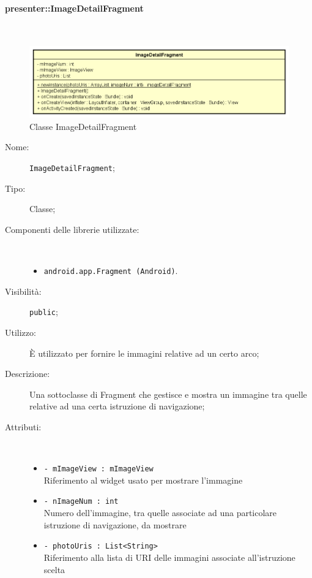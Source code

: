 \documentclass[../DefinizioneDiProdotto.tex]{subfiles}
\begin{document}
\paragraph{presenter::ImageDetailFragment}
\
\begin{figure}[H]
	\centering
	\includegraphics[width=\maxwidth]{img/ImageDetailFragment.png}
	\caption{Classe ImageDetailFragment}\label{fig:presenter::ImageDetailFragment} 
\end{figure}
\begin{description}
	\item[Nome:] \texttt{ImageDetailFragment};
	\item[Tipo:] Classe;
	\item[Componenti delle librerie utilizzate:] \
	\begin{itemize}
		\item \texttt{android.app.Fragment (Android)}.
		
	\end{itemize}
	\item[Visibilità:] \texttt{public};
	\item[Utilizzo:] È utilizzato per fornire le immagini relative ad un certo arco;
	\item[Descrizione:] Una sottoclasse di Fragment che gestisce e mostra un immagine tra quelle relative ad una certa istruzione di navigazione;
	\item[Attributi:] \
	\begin{itemize}
		\item \texttt{- mImageView : mImageView}\\
		Riferimento al widget usato per mostrare l'immagine
		
		\item \texttt{- nImageNum : int}\\
		Numero dell'immagine, tra quelle associate ad una particolare istruzione di navigazione,  da mostrare
		
		\item \texttt{- photoUris : List<String>}\\
		Riferimento alla lista di URI delle immagini associate all'istruzione scelta
		

\end{itemize}
\end{description}
\end{document}
